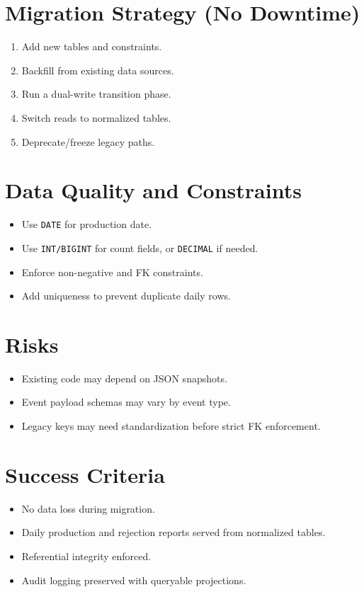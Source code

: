 \documentclass[11pt,a4paper]{article}
\begin{document}
\section*{Migration Strategy (No Downtime)}
\begin{enumerate}
  \item Add new tables and constraints.
  \item Backfill from existing data sources.
  \item Run a dual-write transition phase.
  \item Switch reads to normalized tables.
  \item Deprecate/freeze legacy paths.
\end{enumerate}

\section*{Data Quality and Constraints}
\begin{itemize}
  \item Use \texttt{DATE} for production date.
  \item Use \texttt{INT/BIGINT} for count fields, or \texttt{DECIMAL} if needed.
  \item Enforce non-negative and FK constraints.
  \item Add uniqueness to prevent duplicate daily rows.
\end{itemize}

\section*{Risks}
\begin{itemize}
  \item Existing code may depend on JSON snapshots.
  \item Event payload schemas may vary by event type.
  \item Legacy keys may need standardization before strict FK enforcement.
\end{itemize}

\section*{Success Criteria}
\begin{itemize}
  \item No data loss during migration.
  \item Daily production and rejection reports served from normalized tables.
  \item Referential integrity enforced.
  \item Audit logging preserved with queryable projections.
\end{itemize}
\end{document}

